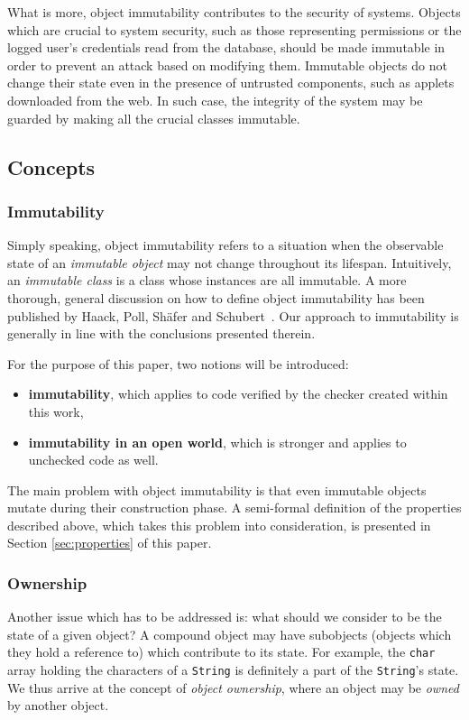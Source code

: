 \documentclass{pracamgr}
\theoremstyle{break}
\theoremstyle{break}
\theoremstyle{break}
\begin{document}
What is more, object immutability contributes to the security of
systems. Objects which are crucial to system security, such as those
representing permissions or the logged user's credentials read from
the database, should be made immutable in order to prevent an attack
based on modifying them. Immutable objects do not change their state
even in the presence of untrusted components, such as applets
downloaded from the web. In such case, the integrity of the system may
be guarded by making all the crucial classes immutable.

\subsection{Concepts}

\subsubsection{Immutability}

Simply speaking, object immutability refers to a situation when the
observable state of an \emph{immutable object} may not change
throughout its lifespan. Intuitively, an \emph{immutable class} is a
class whose instances are all immutable. A more thorough, general
discussion on how to define object immutability has been published by
Haack, Poll, Shäfer and Schubert~\cite{jml-imm}. Our approach to
immutability is generally in line with the conclusions presented
therein.

For the purpose of this paper, two notions will be introduced:
\begin{itemize}
\item \textbf{immutability}, which applies to code verified by the
  checker created within this work,
\item \textbf{immutability in an open world}, which is stronger and
  applies to unchecked code as well. 
\end{itemize}

The main problem with object immutability is that even immutable
objects mutate during their construction phase. A semi-formal
definition of the properties described above, which takes this problem
into consideration, is presented in Section \ref{sec:properties} of
this paper.

\subsubsection{Ownership}

Another issue which has to be addressed is: what should we consider to
be the state of a given object? A compound object may have subobjects
(objects which they hold a reference to) which contribute to its
state. For example, the \texttt{char} array holding the characters of
a \texttt{String} is definitely a part of the \texttt{String}'s
state. We thus arrive at the concept of \emph{object ownership}, where
an object may be \emph{owned} by another object. 
\end{document}
